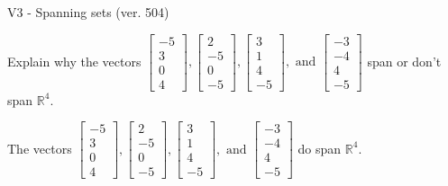 \begin{exercise}
  \begin{exerciseTitle}V3 - Spanning sets (ver. 504)\end{exerciseTitle}
  \begin{exerciseStatement}
    Explain why the vectors \(\left[\begin{array}{r}
-5 \\
3 \\
0 \\
4
\end{array}\right] , \left[\begin{array}{r}
2 \\
-5 \\
0 \\
-5
\end{array}\right] , \left[\begin{array}{r}
3 \\
1 \\
4 \\
-5
\end{array}\right] , \text{ and } \left[\begin{array}{r}
-3 \\
-4 \\
4 \\
-5
\end{array}\right]\) span or don't span \(\mathbb{R}^4\). 
	


  \end{exerciseStatement}
  \begin{exerciseAnswer}
   The vectors \(\left[\begin{array}{r}
-5 \\
3 \\
0 \\
4
\end{array}\right] , \left[\begin{array}{r}
2 \\
-5 \\
0 \\
-5
\end{array}\right] , \left[\begin{array}{r}
3 \\
1 \\
4 \\
-5
\end{array}\right] , \text{ and } \left[\begin{array}{r}
-3 \\
-4 \\
4 \\
-5
\end{array}\right]\) 
  	 do  
	span \(\mathbb{R}^4\).
  


  \end{exerciseAnswer}
\end{exercise}